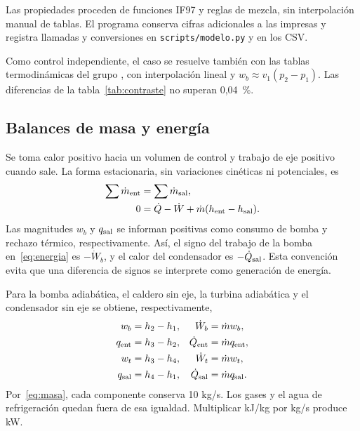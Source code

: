 \documentclass[conference,a4paper,11pt]{IEEEtran}
\begin{document}
Las propiedades proceden de funciones IF97 y reglas de mezcla, sin interpolación manual de tablas. El programa conserva cifras adicionales a las impresas y registra llamadas y conversiones en \texttt{scripts/modelo.py} y en los CSV.

Como control independiente, el caso se resuelve también con las tablas termodinámicas del grupo \cite{tablas_kcha}, con interpolación lineal y $w_b\approx v_1(p_2-p_1)$. Las diferencias de la tabla~\ref{tab:contraste} no superan 0,04~\%.

\begin{table}[t]
\centering
\caption{Contraste de IF97 con las tablas termodinámicas \cite{tablas_kcha}}
\label{tab:contraste}

\end{table}

\subsection{Balances de masa y energía}
Se toma calor positivo hacia un volumen de control y trabajo de eje positivo cuando sale. La forma estacionaria, sin variaciones cinéticas ni potenciales, es
\begin{align}
\sum\dot m_{\rm ent}&=\sum\dot m_{\rm sal},\label{eq:masa}\\
0&=\dot Q-\dot W+\dot m(h_{\rm ent}-h_{\rm sal}).\label{eq:energia}
\end{align}
Las magnitudes $w_b$ y $q_{\rm sal}$ se informan positivas como consumo de bomba y rechazo térmico, respectivamente. Así, el signo del trabajo de la bomba en~\eqref{eq:energia} es $-\dot W_b$, y el calor del condensador es $-\dot Q_{\rm sal}$. Esta convención evita que una diferencia de signos se interprete como generación de energía.

Para la bomba adiabática, el caldero sin eje, la turbina adiabática y el condensador sin eje se obtiene, respectivamente,
\begin{align}
w_b&=h_2-h_1, &\dot W_b&=\dot m w_b,\label{eq:bomba}\\
q_{\rm ent}&=h_3-h_2, &\dot Q_{\rm ent}&=\dot m q_{\rm ent},\label{eq:caldero}\\
w_t&=h_3-h_4, &\dot W_t&=\dot m w_t,\label{eq:turbina}\\
q_{\rm sal}&=h_4-h_1, &\dot Q_{\rm sal}&=\dot m q_{\rm sal}.\label{eq:condensador}
\end{align}
Por~\eqref{eq:masa}, cada componente conserva 10 kg/s. Los gases y el agua de refrigeración quedan fuera de esa igualdad. Multiplicar kJ/kg por kg/s produce kW.
\end{document}
